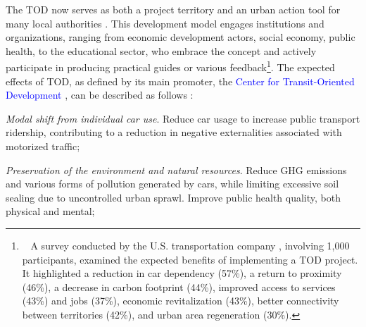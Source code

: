 \begin{refsegment}
The \acrshort{TOD} now serves as both a project territory and an urban action tool for many local authorities \textcolor{blue}{\autocite[23]{bentayou_transit-oriented_2015}}. This development model engages institutions and organizations, ranging from economic development actors, social economy, public health, to the educational sector, who embrace the concept and actively participate in producing practical guides or various feedback\footnote{~
    A survey conducted by the U.S. transportation company \textcolor{blue}{\textcite[9]{hntb_america_2016}}, involving 1,000 participants, examined the expected benefits of implementing a \acrshort{TOD} project. It highlighted a reduction in car dependency (57\%), a return to proximity (46\%), a decrease in carbon footprint (44\%), improved access to services (43\%) and jobs (37\%), economic revitalization (43\%), better connectivity between territories (42\%), and urban area regeneration (30\%).
}. The expected effects of \acrshort{TOD}, as defined by its main promoter, the \textcolor{blue}{Center for Transit-Oriented Development} \textcolor{blue}{\autocites[35-39]{ohland_communicating_2006}[11-21]{noland_measuring_2014}}, can be described as follows \textcolor{blue}{\autocites[11]{bentayou_transit-oriented_2015}[114-122]{ibraeva_transit-oriented_2020}[5-11]{ali_dynamics_2021}[6-11]{wan_equity_2023}}:
    \begin{customitemize}
\item \textsl{Modal shift from individual car use}. Reduce car usage to increase public transport ridership, contributing to a reduction in negative externalities associated with motorized traffic;
\item \textsl{Preservation of the environment and natural resources}. Reduce \acrfull{GHG} emissions and various forms of pollution generated by cars, while limiting excessive soil sealing due to uncontrolled urban sprawl. Improve public health quality, both physical and mental;

\end{customitemize}
\end{refsegment}
